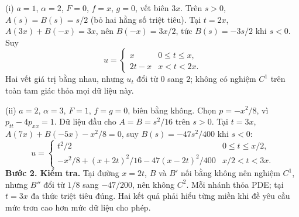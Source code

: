 \documentclass[10pt,a4paper]{article}
\begin{document}
(i) $a=1$, $\alpha=2$, $F=0$, $f=x$, $g=0$, vết biên $3x$. Trên $s>0$, $A(s)=B(s)=s/2$ (bỏ hai hằng số triệt tiêu). Tại $t=2x$, $A(3x)+B(-x)=3x$, nên $B(-x)=3x/2$, tức $B(s)=-3s/2$ khi $s<0$. Suy
\[u=\begin{cases}x&0\le t\le x,\\2t-x&x<t<2x.\end{cases}\]
Hai vết giá trị bằng nhau, nhưng $u_t$ đổi từ $0$ sang $2$; không có nghiệm $C^1$ trên toàn tam giác thỏa mọi dữ liệu này.

(ii) $a=2$, $\alpha=3$, $F=1$, $f=g=0$, biên bằng không. Chọn $p=-x^2/8$, vì $p_{tt}-4p_{xx}=1$. Dữ liệu đầu cho $A=B=s^2/16$ trên $s>0$. Tại $t=3x$, $A(7x)+B(-5x)-x^2/8=0$, suy $B(s)=-47s^2/400$ khi $s<0$:
\[u=\begin{cases}t^2/2&0\le t\le x/2,\\-x^2/8+(x+2t)^2/16-47(x-2t)^2/400&x/2<t<3x.\end{cases}\]
\textbf{Bước 2. Kiểm tra.} Tại đường $x=2t$, $B$ và $B'$ nối bằng không nên nghiệm $C^1$, nhưng $B''$ đổi từ $1/8$ sang $-47/200$, nên không $C^2$. Mỗi nhánh thỏa PDE; tại $t=3x$ đa thức triệt tiêu đúng. Hai kết quả phải hiểu từng miền khi đề yêu cầu mức trơn cao hơn mức dữ liệu cho phép.
\end{document}
